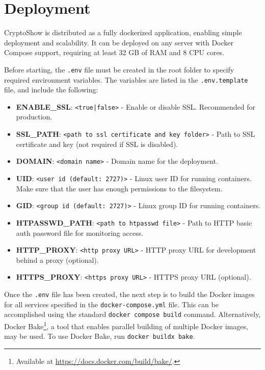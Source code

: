 

\section{Deployment}
\label{sec:deployment}

CryptoShow is distributed as a fully dockerized application, enabling simple deployment and scalability. It can be deployed on any server with Docker Compose support, requiring at least 32 GB of RAM and 8 CPU cores.

Before starting, the \lstinline|.env| file must be created in the root folder to specify required environment variables. The variables are listed in the \lstinline|.env.template| file, and include the following:

\begin{itemize}
    \item \textbf{ENABLE\_SSL}: \texttt{<true|false>} - Enable or disable SSL. Recommended for production.
    \item \textbf{SSL\_PATH}: \texttt{<path to ssl certificate and key folder>} - Path to SSL certificate and key (not required if SSL is disabled).
    \item \textbf{DOMAIN}: \texttt{<domain name>} - Domain name for the deployment.
    \item \textbf{UID}: \texttt{<user id (default: 2727)>} - Linux user ID for running containers. Make sure that the user has enough permissions to the filesystem.
    \item \textbf{GID}: \texttt{<group id (default: 2727)>} - Linux group ID for running containers.
    \item \textbf{HTPASSWD\_PATH}: \texttt{<path to htpasswd file>} - Path to HTTP basic auth password file for monitoring access.
    \item \textbf{HTTP\_PROXY}: \texttt{<http proxy URL>} - HTTP proxy URL for development behind a proxy (optional).
    \item \textbf{HTTPS\_PROXY}: \texttt{<https proxy URL>} - HTTPS proxy URL (optional).
\end{itemize}

Once the \lstinline|.env| file has been created, the next step is to build the Docker images for all services specified in the \lstinline!docker-compose.yml! file. This can be accomplished using the standard \lstinline|docker compose build| command. Alternatively, Docker Bake\footnote{Available at \url{https://docs.docker.com/build/bake/}.}, a tool that enables parallel building of multiple Docker images, may be used. To use Docker Bake, run \lstinline|docker buildx bake|.

